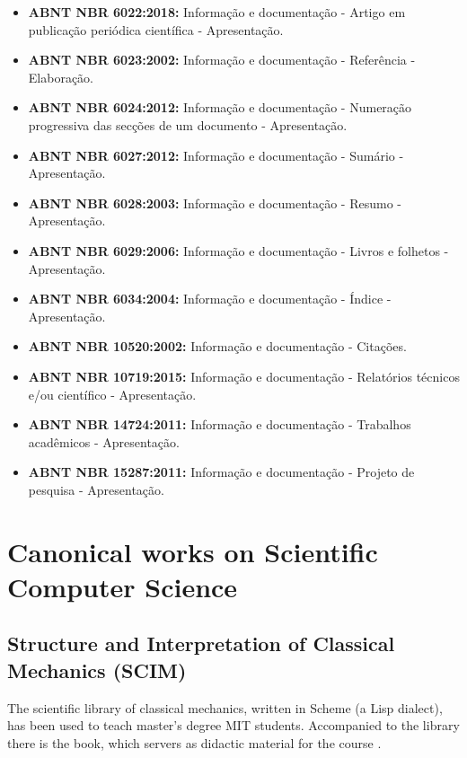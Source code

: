 \documentclass[
12pt,				%
openright,			%
oneside,			%
a4paper,			%
brazil,				%
english,			%
]{abntex2}
\begin{document}
\begin{itemize}
\item \textbf{ABNT NBR 6022:2018:} Informação e documentação -
  Artigo em publicação periódica científica - Apresentação.
\item \textbf{ABNT NBR 6023:2002:} Informação e documentação -
  Referência - Elaboração.
\item \textbf{ABNT NBR 6024:2012:} Informação e documentação -
  Numeração progressiva das secções de um documento - Apresentação.
\item \textbf{ABNT NBR 6027:2012:} Informação e documentação -
  Sumário - Apresentação.
\item \textbf{ABNT NBR 6028:2003:} Informação e documentação -
  Resumo - Apresentação.
\item \textbf{ABNT NBR 6029:2006:} Informação e documentação -
  Livros e folhetos - Apresentação.
\item \textbf{ABNT NBR 6034:2004:} Informação e documentação -
  Índice - Apresentação.
\item \textbf{ABNT NBR 10520:2002:} Informação e documentação -
  Citações.
\item \textbf{ABNT NBR 10719:2015:} Informação e documentação -
  Relatórios técnicos e/ou científico - Apresentação.
\item \textbf{ABNT NBR 14724:2011:} Informação e documentação -
  Trabalhos acadêmicos - Apresentação.
\item \textbf{ABNT NBR 15287:2011:} Informação e documentação -
  Projeto de pesquisa - Apresentação.
\end{itemize}

\section{Canonical works on Scientific Computer Science}
\label{sec:scim}
\subsection{Structure and Interpretation of Classical Mechanics (SCIM)}
\label{sec:scim}
The scientific library of classical mechanics, written in Scheme (a
Lisp dialect), has been used to teach master's degree MIT
students. Accompanied to the library there is the book, which servers
as didactic material for the course \cite{sussman2015structure}.
\end{document}

